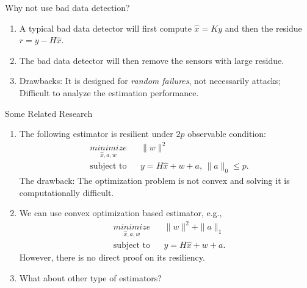 \documentclass[10pt]{beamer}
\begin{document}
\begin{frame}{Why not use bad data detection?}
  \begin{center}

  \end{center}
  \begin{enumerate}
  \item A typical bad data detector will first compute $\hat x = Ky$ and then the residue $r = y - H\hat x$.
  \item The bad data detector will then remove the sensors with large residue.
  \item Drawbacks: It is designed for \emph{random failures}, not necessarily attacks; Difficult to analyze the estimation performance.
  \end{enumerate}
\end{frame}

\begin{frame}{Some Related Research}
  \begin{enumerate}
  \item The following estimator is resilient under $2p$ observable condition:
    \begin{align*}
      & \mathop{\textit{minimize}}\limits_{\hat x,a,w}&
      & \|w\|^2 \\
      &\text{subject to}&
      &y = H \hat x + w + a,\,\|a\|_0\leq p.
    \end{align*}
    The drawback: The optimization problem is not convex and solving it is computationally difficult.
  \item We can use convex optimization based estimator, e.g., 
    \begin{align*}
      & \mathop{\textit{minimize}}\limits_{\hat x,a,w}&
      & \|w\|^2 + \|a\|_1 \\
      &\text{subject to}&
      &y = H \hat x + w + a.
    \end{align*}
    However, there is no direct proof on its resiliency.
  \item What about other type of estimators?
  \end{enumerate}
\end{frame}
\end{document}
